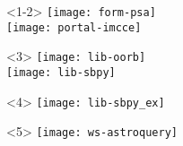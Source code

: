 \begin{frame}
\begin{columns}[T]
\begin{column}{.4\textwidth}
\begin{overlayarea}{\textwidth}{\textheight}
        \begin{onlyenv}<1-2>
          \texttt{[image: form-psa]}\\
          \vspace{1.0em}
          \texttt{[image: portal-imcce]}\\
        \end{onlyenv}

        \begin{onlyenv}<3>
          \vspace{-1.5em}
          \texttt{[image: lib-oorb]}\\
          \texttt{[image: lib-sbpy]}
        \end{onlyenv}

        \begin{onlyenv}<4>
          \hspace*{-3.0em}\texttt{[image: lib-sbpy\_ex]}
        \end{onlyenv}

        \begin{onlyenv}<5>
          \texttt{[image: ws-astroquery]}
        \end{onlyenv}

      \end{overlayarea}
    \end{column}

  \end{columns}

\end{frame}


